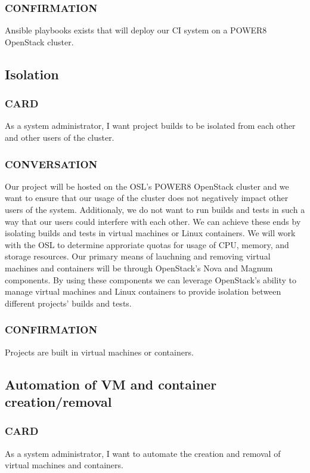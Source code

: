 \documentclass[10pt,letterpaper,onecolumn,journal]{IEEEtran}
\begin{document}
\subsubsection{CONFIRMATION}
Ansible playbooks exists that will deploy our CI system on a POWER8 OpenStack cluster.

\subsection{Isolation}
\subsubsection{CARD}
As a system administrator, I want project builds to be isolated from each other and other users of the cluster.
\subsubsection{CONVERSATION}
Our project will be hosted on the OSL's POWER8 OpenStack cluster and we want to ensure that our usage of the cluster does not negatively impact other users of the system.
Additionaly, we do not want to run builds and tests in such a way that our users could interfere with each other.
We can achieve these ends by isolating builds and tests in virtual machines or Linux containers.
We will work with the OSL to determine approriate quotas for usage of CPU, memory, and storage resources.
Our primary means of lauchning and removing virtual machines and containers will be through OpenStack's Nova and Magnum components. 
By using these components we can leverage OpenStack's ability to manage virtual machines and Linux containers to provide isolation between different projects' builds and tests.
\subsubsection{CONFIRMATION}
Projects are built in virtual machines or containers.

\subsection{Automation of VM and container creation/removal}
\subsubsection{CARD}
As a system administrator, I want to automate the creation and removal of virtual machines and containers.
\end{document}
